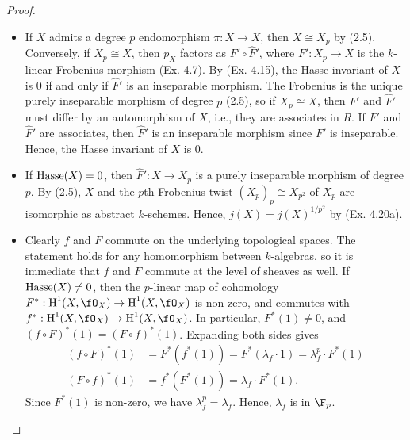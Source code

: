 \documentclass[a4paper]{article}
\begin{document}
\begin{enumerate} [label=\textbf{\arabic*.}, leftmargin=0em]
\begin{proof}
\begin{itemize} [leftmargin=0cm]
                  \item[(b)] If $X$ admits a degree $p$ endomorphism $\pi : X \to X$, then $X \cong X_p$ by (2.5).
                        Conversely, if $X_p \cong X$, then $p_X$ factors as $F' \circ \hat{F}'$, where $F' : X_p \to X$ is the $k$-linear Frobenius morphism (Ex. 4.7).
                        By (Ex. 4.15), the Hasse invariant of $X$ is 0 if and only if $\hat{F}'$ is an inseparable morphism.
                        The Frobenius is the unique purely inseparable morphism of degree $p$ (2.5), so if $X_p \cong X$, then $F'$ and $\hat{F}'$ must differ by an automorphism of $X$, i.e., they are associates in $R$.
                        If $F'$ and $\hat{F}'$ are associates, then $\hat{F}'$ is an inseparable morphism since $F'$ is inseparable.
                        Hence, the Hasse invariant of $X$ is 0.

                  \item[(c)] If $\operatorname{Hasse}(X) = 0$, then $\hat{F}' : X \to X_p$ is a purely inseparable morphism of degree $p$.
                        By (2.5), $X$ and the $p$th Frobenius twist $(X_{p})_p \cong X_{p^2}$ of $X_p$ are isomorphic as abstract $k$-schemes.
                        Hence, $j(X) = j(X)^{1/p^2}$ by (Ex. 4.20a).

                  \item[(d)] Clearly $f$ and $F$ commute on the underlying topological spaces.
                        The statement holds for any homomorphism between $k$-algebras, so it is immediate that $f$ and $F$ commute at the level of sheaves as well.
                        If $\operatorname{Hasse}(X) \neq 0$, then the $p$-linear map of cohomology $F^* : \cH^1(X, \fO_X) \to \cH^1(X, \fO_X)$ is non-zero, and commutes with $f^* : \cH^1(X, \fO_X) \to \cH^1(X, \fO_X)$.
                        In particular, $F^*(1) \neq 0$, and $(f \circ F)^*(1) = (F \circ f)^*(1)$.
                        Expanding both sides gives
                        \begin{align*}
                            (f \circ F)^*(1) & = F^*(f^*(1)) = F^*(\lambda_f \cdot 1) = \lambda_f^p \cdot F^*(1) \\
                            (F \circ f)^*(1) & = f^*(F^*(1)) = \lambda_f \cdot F^*(1).
                        \end{align*}
                        Since $F^*(1)$ is non-zero, we have $\lambda_f^p = \lambda_f$.
                        Hence, $\lambda_f$ is in $\F_p$.
              \end{itemize}
          \end{proof}
\end{enumerate}
\end{document}
